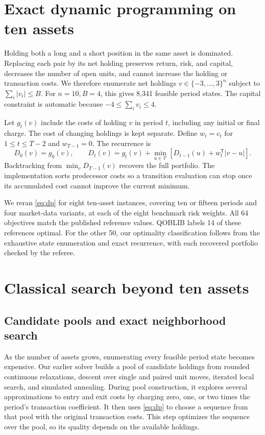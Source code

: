 \documentclass[a4paper]{article}
\begin{document}
\section{Exact dynamic programming on ten assets}

Holding both a long and a short position in the same asset is dominated. Replacing each pair by its net holding
preserves return, risk, and capital, decreases the number of open units, and cannot increase the holding or transaction costs.
We therefore enumerate net holdings \(v\in\{-3,\ldots,3\}^{n}\) subject to \(\sum_i|v_i|\le B\).
For \(n=10,B=4\), this gives 8,341 feasible period states. The capital constraint is automatic because
\(-4\le\sum_i v_i\le4\).

Let \(g_t(v)\) include the costs of holding \(v\) in period \(t\), including any initial or final charge.
The cost of changing holdings is kept separate. Define \(w_t=c_t\)
for \(1\le t\le T-2\) and \(w_{T-1}=0\). The recurrence is
\begin{equation}
\label{eq:dp}
D_0(v)=g_0(v),\qquad
D_t(v)=g_t(v)+\min_{u\in\mathcal V}
\left[D_{t-1}(u)+w_t^\mathsf{T}|v-u|\right].
\end{equation}
Backtracking from \(\min_v D_{T-1}(v)\) recovers the full portfolio.
The implementation sorts predecessor costs so a transition evaluation can stop once its accumulated cost
cannot improve the current minimum.

We reran \eqref{eq:dp} for eight ten-asset instances, covering ten or fifteen periods and four market-data variants,
at each of the eight benchmark risk weights. All 64 objectives match the published reference values.
QOBLIB labels 14 of these references optimal. For the other 50, our optimality classification follows
from the exhaustive state enumeration and exact recurrence, with each recovered portfolio checked by the referee.

\clearpage
\section{Classical search beyond ten assets}

\subsection{Candidate pools and exact neighborhood search}

As the number of assets grows, enumerating every feasible period state becomes expensive.
Our earlier solver builds a pool of candidate holdings from rounded continuous relaxations, descent over single
and paired unit moves, iterated local search, and simulated annealing. During pool construction, it explores
several approximations to entry and exit costs by charging zero, one, or two times the period's transaction
coefficient. It then uses \eqref{eq:dp} to choose a sequence from that pool with the original transaction costs.
This step optimizes the sequence over the pool, so its quality depends on the available holdings.
\end{document}
